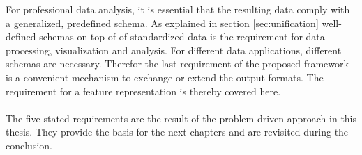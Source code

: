 For professional data analysis, it is essential that the resulting data comply with a generalized, predefined schema. As explained in section \ref{sec:unification} well-defined schemas on top of of standardized data is the requirement for data processing, visualization and analysis. For different data applications, different schemas are necessary. Therefor the last requirement of the proposed framework is a convenient mechanism to exchange or extend the output formats. The requirement for a feature representation is thereby covered here.
\\\\
The five stated requirements are the result of the problem driven approach in this thesis. They provide the basis for the next chapters and are revisited during the conclusion.